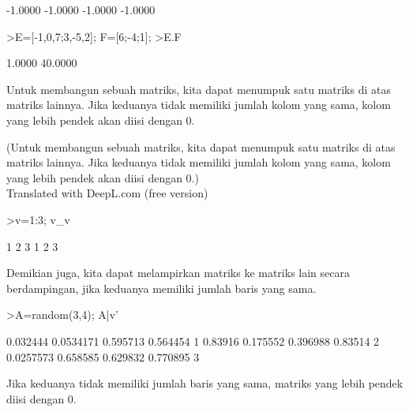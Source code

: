 \documentclass{article}
\begin{document}
\begin{eulernotebook}
\begin{euleroutput}
      -1.0000     -1.0000 
      -1.0000     -1.0000 
\end{euleroutput}
\begin{eulerprompt}
>E=[-1,0,7;3,-5,2]; F=[6;-4;1];
>E.F
\end{eulerprompt}
\begin{euleroutput}
       1.0000 
      40.0000 
\end{euleroutput}
\begin{eulercomment}
Untuk membangun sebuah matriks, kita dapat menumpuk satu matriks di
atas matriks lainnya. Jika keduanya tidak memiliki jumlah kolom yang
sama, kolom yang lebih pendek akan diisi dengan 0.


(Untuk membangun sebuah matriks, kita dapat menumpuk satu matriks di
atas matriks lainnya. Jika keduanya tidak memiliki jumlah kolom yang
sama, kolom yang lebih pendek akan diisi dengan 0.)\\
Translated with DeepL.com (free version)
\end{eulercomment}
\begin{eulerprompt}
>v=1:3; v_v
\end{eulerprompt}
\begin{euleroutput}
              1             2             3 
              1             2             3 
\end{euleroutput}
\begin{eulercomment}
Demikian juga, kita dapat melampirkan matriks ke matriks lain secara
berdampingan, jika keduanya memiliki jumlah baris yang sama.
\end{eulercomment}
\begin{eulerprompt}
>A=random(3,4); A|v'
\end{eulerprompt}
\begin{euleroutput}
       0.032444     0.0534171      0.595713      0.564454             1 
        0.83916      0.175552      0.396988       0.83514             2 
      0.0257573      0.658585      0.629832      0.770895             3 
\end{euleroutput}
\begin{eulercomment}
Jika keduanya tidak memiliki jumlah baris yang sama, matriks yang
lebih pendek diisi dengan 0.



\end{eulercomment}
\end{eulernotebook}
\end{document}
